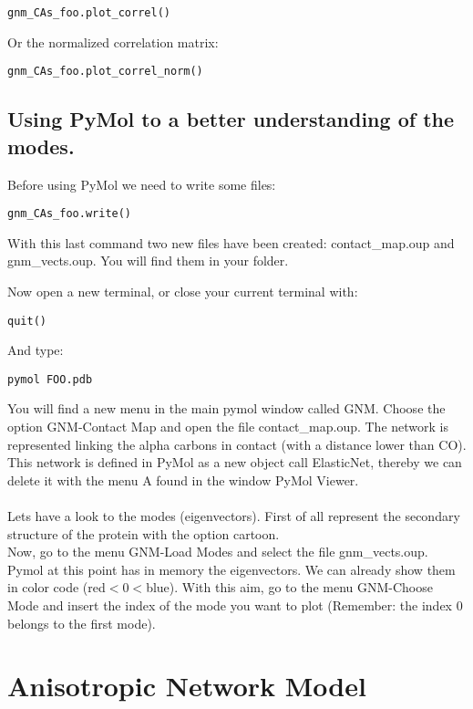 \documentclass[12pt]{article}
\begin{document}
\begin{verbatim}
gnm_CAs_foo.plot_correl()
\end{verbatim}

Or the normalized correlation matrix:

\begin{verbatim}
gnm_CAs_foo.plot_correl_norm()
\end{verbatim}


\subsection*{Using PyMol to a better understanding of the modes.}

Before using PyMol we need to write some files:

\begin{verbatim}
gnm_CAs_foo.write()
\end{verbatim}

With this last command two new files have been created:
contact\_map.oup and gnm\_vects.oup. You will find them in your folder.

Now open a new terminal, or close your current terminal with:

\begin{verbatim}
quit()
\end{verbatim}

And type:
\begin{verbatim}
pymol FOO.pdb
\end{verbatim}

You will find a new menu in the main pymol window called GNM. Choose
the option GNM-Contact Map and open the file contact\_map.oup.  The
network is represented linking the alpha carbons in contact (with a
distance lower than CO). This network is defined in PyMol as a new
object call ElasticNet, thereby we can delete it with the menu A found
in the window PyMol Viewer.  \\ \\ Lets have a look to the modes
(eigenvectors). First of all represent the secondary structure of the
protein with the option cartoon.  \\ Now, go to the menu GNM-Load
Modes and select the file gnm\_vects.oup. Pymol at this point has in
memory the eigenvectors. We can already show them in color code
(red$<$0$<$blue). With this aim, go to the menu GNM-Choose Mode and insert
the index of the mode you want to plot (Remember: the index 0 belongs
to the first mode).

\section*{Anisotropic Network Model}
\end{document}
